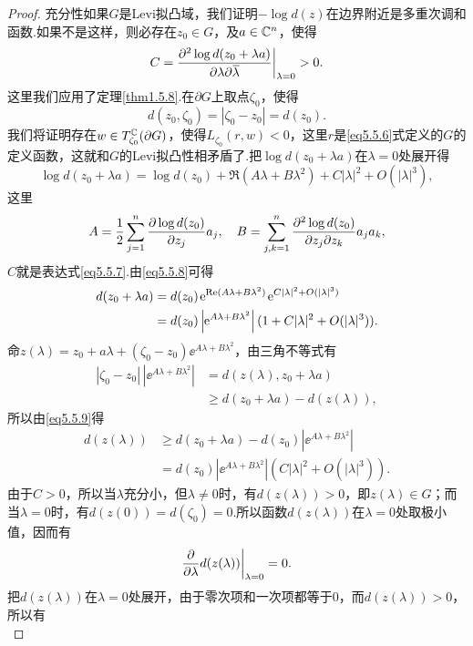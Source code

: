 \begin{proof}
	充分性\quad 如果$G$是Levi拟凸域，我们证明$-\log d(z)$在边界附近是多重次调和函数.如果不是这样，则必存在$z_0\in G$，及$a\in\mathbb C^n$，使得
	\begin{equation}\label{eq5.5.7}
		C=\frac{\partial^2 \log d(z_0+\lambda a)}{\partial \lambda\partial {}\mkern1mu\overline{\mkern-1mu\lambda}}\bigg|_{\lambda=0}>0.
	\end{equation}
这里我们应用了定理\ref{thm1.5.8}.在$\partial G$上取点$\zeta_0$，使得
\[d(z_0,\zeta_0)=|\zeta_0-z_0|=d(z_0).\]
我们将证明存在$w\in T_{\zeta_0}^\mathbb C(\partial G)$，使得$L_{\zeta_0}(r,w)<0$，这里$r$是\eqref{eq5.5.6}式定义的$G$的定义函数，这就和$G$的Levi拟凸性相矛盾了.把$\log d(z_0+\lambda a)$在$\lambda=0$处展开得
\begin{equation}\label{eq5.5.8}
	\log d(z_0+\lambda a)=\log d(z_0)+\Re(A\lambda+B\lambda^2)+C|\lambda|^2+O(|\lambda|^3),
\end{equation}
这里
\[A=\frac12\sum_{j=1}^{n}\frac{\partial \log d(z_0)}{\partial z_j}a_j,\quad B=\sum_{j,k=1}^{n}\frac{\partial^2 \log d(z_0)}{\partial z_j\partial z_k}a_ja_k,\]
$C$就是表达式\eqref{eq5.5.7}.由\eqref{eq5.5.8}可得
\begin{align}\label{eq5.5.9}
	d(z_0+\lambda a)
	&=d(z_0)\operatorname{\!\!\;\mathrm e}^{\operatorname{Re}(A\lambda+B\lambda^2)}\operatorname{\!\!\;\mathrm e}^{C|\lambda|^2+O(|\lambda|^3)}\notag\\
	&=d(z_0)\left|\operatorname{\!\!\;\mathrm e}^{A\lambda+B\lambda^2}\right|(1+C|\lambda|^2+O(|\lambda|^3)).
\end{align}
命$z(\lambda)=z_0+a\lambda+(\zeta_0-z_0)\ee^{A\lambda+B\lambda^2}$，由三角不等式有
\begin{align*}
	|\zeta_0-z_0|\,\left|\ee^{A\lambda+B\lambda^2}\right|
	&=d(z(\lambda),z_0+\lambda a)\\
	&\ge d(z_0+\lambda a)-d(z(\lambda)),
\end{align*}
所以由\eqref{eq5.5.9}得
\begin{align*}
	d(z(\lambda))
	&\ge d(z_0+\lambda a)-d(z_0)\left|\ee^{A\lambda+B\lambda^2}\right|\\
	&=d(z_0)\left|\ee^{A\lambda+B\lambda^2}\right|(C|\lambda|^2+O(|\lambda|^3)).
\end{align*}
由于$C>0$，所以当$\lambda$充分小，但$\lambda\neq0$时，有$d(z(\lambda))>0$，即$z(\lambda)\in G$；而当$\lambda=0$时，有$d(z(0))=d(\zeta_0)=0$.所以函数$d(z(\lambda))$在$\lambda=0$处取极小值，因而有
\begin{equation}\label{eq5.5.10}
	\frac{\partial }{\partial \lambda}d(z(\lambda))\bigg|_{\lambda=0}=0.
\end{equation}
把$d(z(\lambda))$在$\lambda=0$处展开，由于零次项和一次项都等于$0$，而$d(z(\lambda))>0$，所以有
\begin{equation}\label{eq5.5.11}

\end{equation}
\end{proof}
